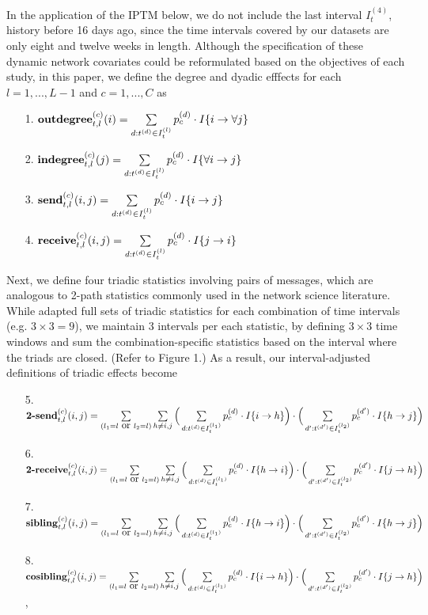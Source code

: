 In the application of the IPTM below, we do not include the last interval $I_t^{(4)}$, history before 16 days ago, since the time intervals covered by our datasets are only eight and twelve weeks in length. Although the specification of these dynamic network covariates could be reformulated based on the objectives of each study, in this paper, we define the degree and dyadic efffects for each $l=1,...,L-1$ and $c = 1,...,C$ as
\begin{itemize}
	\item [1.]  $\mbox{\textbf{outdegree}}^{(c)}_{t, l}(i)=\sum\limits_{d: t^{(d)} \in I_{t}^{(l)}}p_c^{(d)}\cdot I\{i\rightarrow \forall j\}$
	\item [2.] $\mbox{\textbf{indegree}}^{(c)}_{t, l}(j)=\sum\limits_{d: t^{(d)} \in I_{t}^{(l)}}p_c^{(d)}\cdot I\{\forall i \rightarrow j\}$	 	 	
	\item [3.]  $\mbox{\textbf{send}}^{(c)}_{t, l}(i, j)=\sum\limits_{d: t^{(d)} \in I_{t}^{(l)}}p_c^{(d)}\cdot I\{i\rightarrow j\}$
	\item [4.] $\mbox{\textbf{receive}}^{(c)}_{t, l}(i, j)=\sum\limits_{d: t^{(d)} \in I_{t}^{(l)}}p_c^{(d)}\cdot I\{j\rightarrow i\}$
\end{itemize}
Next, we define four triadic statistics involving pairs of messages, which are analogous to 2-path statistics commonly used in the network science literature. While \cite{PerryWolfe2012} adapted full sets of triadic statistics for each combination of time intervals (e.g. $3 \times 3=9$), we maintain 3 intervals per each statistic, by defining $3 \times 3$ time windows and sum the combination-specific statistics based on the interval where the triads are closed. (Refer to Figure 1.) As a result, our interval-adjusted definitions of triadic effects become
\begin{itemize}
	\item [5.] $\mbox{\textbf{2-send}}^{(c)}_{t, l}(i, j)=\sum\limits_{\substack{(l_1= l \mbox { or }  l_2 = l)} }\sum\limits_{h \neq i, j}\Big(\sum\limits_{d: t^{(d)} \in I_{t}^{(l_1)}}p_c^{(d)}\cdot I\{i\rightarrow h\}\Big)\cdot \Big(\sum\limits_{d': t^{(d')} \in I_{t}^{( l_2)}}p_c^{(d')}\cdot I\{h\rightarrow j\}\Big)$
	\item [6.] $\mbox{\textbf{2-receive}}^{(c)}_{t, l}(i, j)=\sum\limits_{\substack{(l_1= l \mbox { or }  l_2 = l)} }\sum\limits_{h \neq i, j}\Big(\sum\limits_{d: t^{(d)} \in I_t^{(l_1)}}p_c^{(d)}\cdot I\{h\rightarrow i\}\Big)\cdot \Big(\sum\limits_{d': t^{(d')} \in I_t^{(l_2)}}p_c^{(d')}\cdot I\{j\rightarrow h\}\Big)$
	\item [7.] $\mbox{\textbf{sibling}}^{(c)}_{t, l}(i, j)=\sum\limits_{\substack{(l_1= l \mbox { or }  l_2 = l)} }\sum\limits_{h \neq i, j}\Big(\sum\limits_{d: t^{(d)} \in I_t^{(l_1)}}p_c^{(d)}\cdot I\{h\rightarrow i\}\Big)\cdot \Big(\sum\limits_{d': t^{(d')} \in I_t^{(l_2)}}p_c^{(d')}\cdot I\{h\rightarrow j\}\Big)$
	\item [8.] $\mbox{\textbf{cosibling}}^{(c)}_{t, l}(i, j)=\sum\limits_{\substack{(l_1= l \mbox { or }  l_2 = l)} }\sum\limits_{h \neq i, j}\Big(\sum\limits_{d: t^{(d)} \in I_t^{(l_1)}}p_c^{(d)}\cdot I\{i\rightarrow h\}\Big)\cdot \Big(\sum\limits_{d': t^{(d')} \in I_t^{(l_2)}}p_c^{(d')}\cdot I\{j\rightarrow h\}\Big)$,
\end{itemize}
